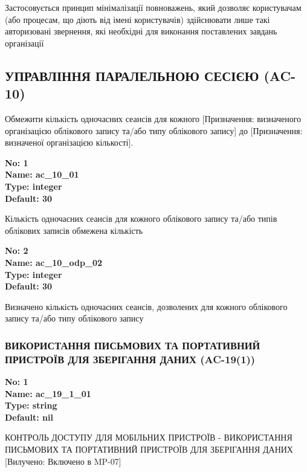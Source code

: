 \documentclass{article}
\begin{document}
{\footnotesize Застосовується принцип мінімалізації повноважень, який дозволяє користувачам (або процесам, що діють від імені користувачів) здійснювати лише такі авторизовані звернення, які необхідні для виконання поставлених завдань організації}




\subsection{УПРАВЛІННЯ ПАРАЛЕЛЬНОЮ СЕСІЄЮ (AC-10)}
Обмежити кількість одночасних сеансів для кожного [Призначення: визначеного організацією облікового запису та/або типу облікового запису] до [Призначення: визначеної організацією кількості].

\vspace{10pt}
{\footnotesize\bfseries
No: 1\\
Name: ac\_\allowbreak{}10\_\allowbreak{}01\\
Type: integer\\
Default: 30
}

{\footnotesize Кількість одночасних сеансів для кожного облікового запису та/або типів облікових записів обмежена кількість}


{\footnotesize\bfseries
No: 2\\
Name: ac\_\allowbreak{}10\_\allowbreak{}odp\_\allowbreak{}02\\
Type: integer\\
Default: 30
}

{\footnotesize Визначено кількість одночасних сеансів, дозволених для кожного облікового запису та/або типу облікового запису}




\subsubsection{ВИКОРИСТАННЯ ПИСЬМОВИХ ТА ПОРТАТИВНИЙ ПРИСТРОЇВ ДЛЯ ЗБЕРІГАННЯ ДАНИХ (AC-19(1))}


\vspace{10pt}
{\footnotesize\bfseries
No: 1\\
Name: ac\_\allowbreak{}19\_\allowbreak{}1\_\allowbreak{}01\\
Type: string\\
Default: nil
}

{\footnotesize КОНТРОЛЬ ДОСТУПУ ДЛЯ МОБІЛЬНИХ ПРИСТРОЇВ - ВИКОРИСТАННЯ ПИСЬМОВИХ ТА ПОРТАТИВНИЙ ПРИСТРОЇВ ДЛЯ ЗБЕРІГАННЯ ДАНИХ [Вилучено: Включено в MP-07]}
\end{document}
